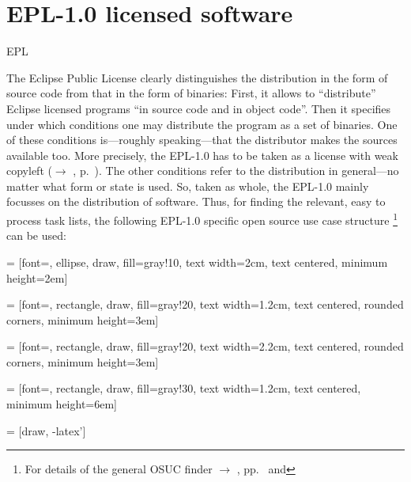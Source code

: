 \section{EPL-1.0 licensed software}
\begin{license}{EPL}

The Eclipse Public License clearly distinguishes the distribution in the form of
source code from that in the form of binaries: First, it allows to
\enquote{distribute} Eclipse licensed programs \enquote{in source code and in
object code}. Then it specifies under which conditions one may
distribute the program as a set of binaries. One of
these conditions is---roughly speaking---that the distributor makes the sources
available too. More precisely, the EPL-1.0 has to be taken as a
license with weak copyleft ($\rightarrow$ \oslic, p.\ ).
The other conditions refer to the distribution in general---no matter what form
or state is used. So, taken as whole, the EPL-1.0 mainly
focusses on the distribution of software.  Thus, for finding the relevant, easy
to process task lists, the following EPL-1.0 specific open source use case 
structure%
  \footnote{For details of the general OSUC finder $\rightarrow$ \oslic,
    pp.\ \pageref{OsucTokens} and \pageref{OsucDefinitionTree}}
can be used:
 
 = [font=\small, ellipse, draw, fill=gray!10, 
    text width=2cm, text centered, minimum height=2em]

 = [font=\footnotesize, rectangle, draw, fill=gray!20, 
    text width=1.2cm, text centered, rounded corners, minimum height=3em]

 = [font=\footnotesize, rectangle, draw, fill=gray!20, 
    text width=2.2cm, text centered, rounded corners, minimum height=3em]
    
 = [font=\tiny, rectangle, draw, fill=gray!30, 
    text width=1.2cm, text centered, minimum height=6em]

 = [draw, -latex']

\end{license}
